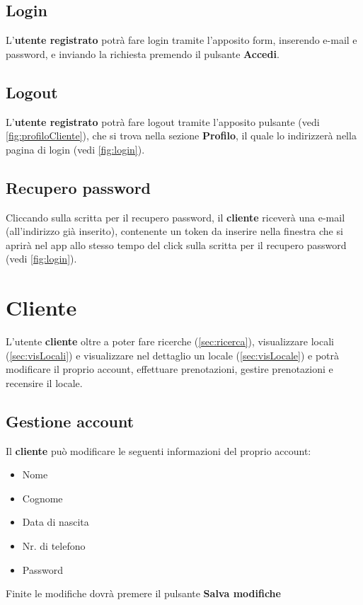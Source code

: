 \subsection{Login}
L'\textbf{utente registrato} potrà fare login tramite l'apposito form, inserendo e-mail e password, e inviando la 
richiesta premendo il pulsante \textbf{Accedi}.

\subsection{Logout}
L'\textbf{utente registrato} potrà fare logout tramite l'apposito pulsante (vedi \ref{fig:profiloCliente}), che si 
trova nella sezione \textbf{Profilo}, il quale lo indirizzerà nella pagina di login (vedi \ref{fig:login}).


\subsection{Recupero password} \label{sec:recPsw}
Cliccando sulla scritta per il recupero password, il \textbf{cliente} riceverà una e-mail 
(all'indirizzo già inserito), contenente un token da inserire nella finestra che si 
aprirà nel app allo stesso tempo del click sulla scritta per il recupero password (vedi \ref{fig:login}).

\section*{Cliente} \label{sec:cliente}
L'utente \textbf{cliente} oltre a poter fare ricerche (\ref{sec:ricerca}), visualizzare locali 
(\ref{sec:visLocali}) e visualizzare nel dettaglio un locale (\ref{sec:visLocale}) e potrà modificare il proprio
account, effettuare prenotazioni, gestire prenotazioni e recensire il locale.

\subsection{Gestione account}
Il \textbf{cliente} può modificare le seguenti informazioni del proprio account:
\begin{itemize}
    \item Nome
    \item Cognome
    \item Data di nascita
    \item Nr. di telefono
    \item Password
    \label{sec:gesAccountCliente}
\end{itemize}
Finite le modifiche dovrà premere il pulsante \textbf{Salva modifiche}

